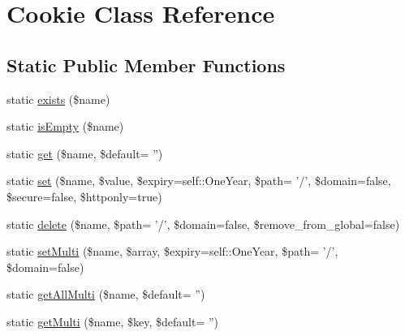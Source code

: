 \hypertarget{class_cookie}{\section{Cookie Class Reference}
\label{class_cookie}
}
\subsection*{Static Public Member Functions}
\begin{DoxyCompactItemize}
\item 
static \hyperlink{class_cookie_a8b1b5a4dd1b1db66dfdbf1797f7c6ca3}{exists} (\$name)
\item 
static \hyperlink{class_cookie_adb5118ec874e8b05ad04383ef47b3d33}{is\-Empty} (\$name)
\item 
static \hyperlink{class_cookie_a8de2755d9f5089dedcf2ea146372d3c2}{get} (\$name, \$default= '')
\item 
static \hyperlink{class_cookie_ab6596e66cd53fb360f8774e79e4cf647}{set} (\$name, \$value, \$expiry=self\-::\-One\-Year, \$path= '/', \$domain=false, \$secure=false, \$httponly=true)
\item 
static \hyperlink{class_cookie_a509037890b7841315fec02ada395409d}{delete} (\$name, \$path= '/', \$domain=false, \$remove\-\_\-from\-\_\-global=false)
\item 
static \hyperlink{class_cookie_a27390ef5ef98875bd5e4a903d3dceaae}{set\-Multi} (\$name, \$array, \$expiry=self\-::\-One\-Year, \$path= '/', \$domain=false)
\item 
static \hyperlink{class_cookie_a7a1f4a3d8604c65e8eb9ef102e0ec892}{get\-All\-Multi} (\$name, \$default= '')
\item 
static \hyperlink{class_cookie_adda38d5ea097c287be032966f906d213}{get\-Multi} (\$name, \$key, \$default= '')
\end{DoxyCompactItemize}
